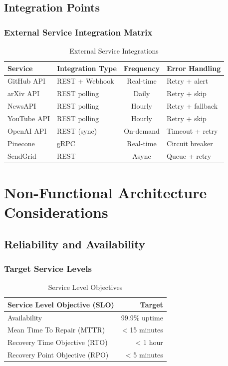 \documentclass[12pt,a4paper]{report}
\begin{document}
\section{Integration Points}

\subsection{External Service Integration Matrix}

\begin{table}[H]
\centering
\small
\begin{tabular}{|l|l|c|l|}
\hline
\textbf{Service} & \textbf{Integration Type} & \textbf{Frequency} & \textbf{Error Handling} \\
\hline
GitHub API & REST + Webhook & Real-time & Retry + alert \\
arXiv API & REST polling & Daily & Retry + skip \\
NewsAPI & REST polling & Hourly & Retry + fallback \\
YouTube API & REST polling & Hourly & Retry + skip \\
OpenAI API & REST (sync) & On-demand & Timeout + retry \\
Pinecone & gRPC & Real-time & Circuit breaker \\
SendGrid & REST & Async & Queue + retry \\
\hline
\end{tabular}
\caption{External Service Integrations}
\end{table}

\newpage

\chapter{Non-Functional Architecture Considerations}

\section{Reliability and Availability}

\subsection{Target Service Levels}

\begin{table}[H]
\centering
\small
\begin{tabular}{|l|r|}
\hline
\textbf{Service Level Objective (SLO)} & \textbf{Target} \\
\hline
Availability & 99.9\% uptime \\
Mean Time To Repair (MTTR) & < 15 minutes \\
Recovery Time Objective (RTO) & < 1 hour \\
Recovery Point Objective (RPO) & < 5 minutes \\
\hline
\end{tabular}
\caption{Service Level Objectives}
\end{table}
\end{document}
